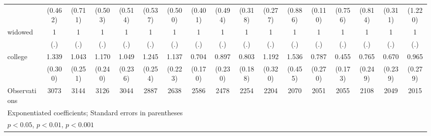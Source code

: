 {\begin{tabular}{l*{16}{c}}
                    &     (0.462)         &     (0.711)         &     (0.503)         &     (0.514)         &     (0.537)         &     (0.500)         &     (0.401)         &     (0.494)         &     (0.318)         &     (0.277)         &     (0.886)         &     (0.110)         &     (0.756)         &     (0.814)         &     (0.311)         &     (1.220)         \\
[1em]
widowed             &           1         &           1         &           1         &           1         &           1         &           1         &           1         &           1         &           1         &           1         &           1         &           1         &           1         &           1         &           1         &           1         \\
                    &         (.)         &         (.)         &         (.)         &         (.)         &         (.)         &         (.)         &         (.)         &         (.)         &         (.)         &         (.)         &         (.)         &         (.)         &         (.)         &         (.)         &         (.)         &         (.)         \\
[1em]
college             &       1.339         &       1.043         &       1.170         &       1.049         &       1.245         &       1.137         &       0.704         &       0.897         &       0.803         &       1.192         &       1.536         &       0.787         &       0.455\sym{*}  &       0.765         &       0.670         &       0.965         \\
                    &     (0.300)         &     (0.251)         &     (0.240)         &     (0.236)         &     (0.254)         &     (0.223)         &     (0.170)         &     (0.230)         &     (0.188)         &     (0.320)         &     (0.455)         &     (0.270)         &     (0.173)         &     (0.249)         &     (0.239)         &     (0.279)         \\
\hline
Observations        &        3073         &        3144         &        3126         &        3044         &        2887         &        2638         &        2586         &        2478         &        2254         &        2204         &        2070         &        2051         &        2055         &        2108         &        2049         &        2015         \\
\hline\hline
\multicolumn{17}{l}{\footnotesize Exponentiated coefficients; Standard errors in parentheses}\\
\multicolumn{17}{l}{\footnotesize \sym{*} \(p<0.05\), \sym{**} \(p<0.01\), \sym{***} \(p<0.001\)}\\
\end{tabular}
}
